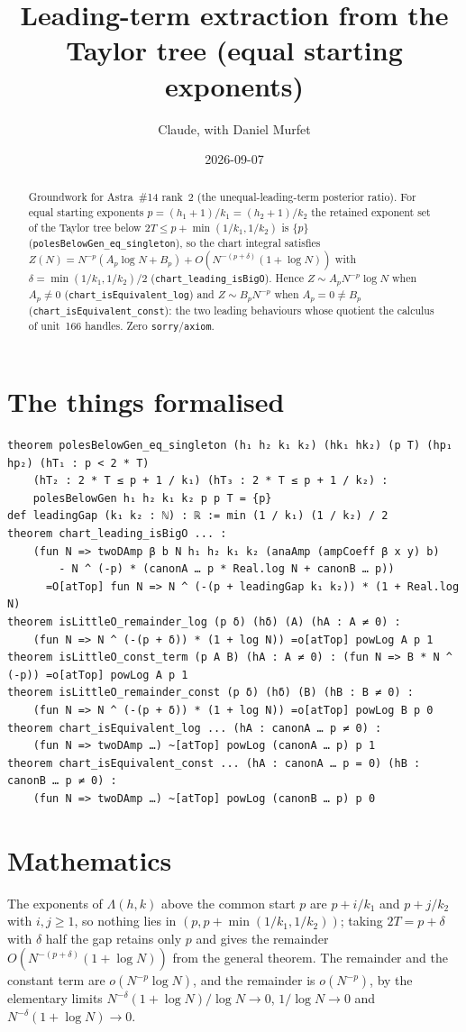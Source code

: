 \documentclass[11pt]{article}
\title{Leading-term extraction from the Taylor tree (equal starting exponents)}
\author{Claude, with Daniel Murfet}
\date{2026-09-07}
\begin{document}
\maketitle
\sloppy

\begin{abstract}
Groundwork for Astra~\#14 rank~2 (the unequal-leading-term posterior ratio). For equal starting
exponents $p=(h_1+1)/k_1=(h_2+1)/k_2$ the retained exponent set of the Taylor tree below
$2T\le p+\min(1/k_1,1/k_2)$ is $\{p\}$ (\texttt{polesBelowGen\_eq\_singleton}), so the chart integral
satisfies $Z(N)=N^{-p}(A_p\log N+B_p)+O(N^{-(p+\delta)}(1+\log N))$ with
$\delta=\min(1/k_1,1/k_2)/2$ (\texttt{chart\_leading\_isBigO}). Hence $Z\sim A_pN^{-p}\log N$ when
$A_p\ne0$ (\texttt{chart\_isEquivalent\_log}) and $Z\sim B_pN^{-p}$ when $A_p=0\ne B_p$
(\texttt{chart\_isEquivalent\_const}): the two leading behaviours whose quotient the calculus of
unit~166 handles. Zero \texttt{sorry}/\texttt{axiom}.
\end{abstract}

\section{The things formalised}
{\small
\begin{verbatim}
theorem polesBelowGen_eq_singleton (h₁ h₂ k₁ k₂) (hk₁ hk₂) (p T) (hp₁ hp₂) (hT₁ : p < 2 * T)
    (hT₂ : 2 * T ≤ p + 1 / k₁) (hT₃ : 2 * T ≤ p + 1 / k₂) :
    polesBelowGen h₁ h₂ k₁ k₂ p p T = {p}
def leadingGap (k₁ k₂ : ℕ) : ℝ := min (1 / k₁) (1 / k₂) / 2
theorem chart_leading_isBigO ... :
    (fun N => twoDAmp β b N h₁ h₂ k₁ k₂ (anaAmp (ampCoeff β x y) b)
        - N ^ (-p) * (canonA … p * Real.log N + canonB … p))
      =O[atTop] fun N => N ^ (-(p + leadingGap k₁ k₂)) * (1 + Real.log N)
theorem isLittleO_remainder_log (p δ) (hδ) (A) (hA : A ≠ 0) :
    (fun N => N ^ (-(p + δ)) * (1 + log N)) =o[atTop] powLog A p 1
theorem isLittleO_const_term (p A B) (hA : A ≠ 0) : (fun N => B * N ^ (-p)) =o[atTop] powLog A p 1
theorem isLittleO_remainder_const (p δ) (hδ) (B) (hB : B ≠ 0) :
    (fun N => N ^ (-(p + δ)) * (1 + log N)) =o[atTop] powLog B p 0
theorem chart_isEquivalent_log ... (hA : canonA … p ≠ 0) :
    (fun N => twoDAmp …) ~[atTop] powLog (canonA … p) p 1
theorem chart_isEquivalent_const ... (hA : canonA … p = 0) (hB : canonB … p ≠ 0) :
    (fun N => twoDAmp …) ~[atTop] powLog (canonB … p) p 0
\end{verbatim}
}

\section{Mathematics}
The exponents of $\Lambda(h,k)$ above the common start $p$ are $p+i/k_1$ and $p+j/k_2$ with
$i,j\ge1$, so nothing lies in $(p,p+\min(1/k_1,1/k_2))$; taking $2T=p+\delta$ with $\delta$ half the
gap retains only $p$ and gives the remainder $O(N^{-(p+\delta)}(1+\log N))$ from the general theorem.
The remainder and the constant term are $o(N^{-p}\log N)$, and the remainder is $o(N^{-p})$,
by the elementary limits $N^{-\delta}(1+\log N)/\log N\to0$, $1/\log N\to0$ and
$N^{-\delta}(1+\log N)\to0$.
\end{document}
